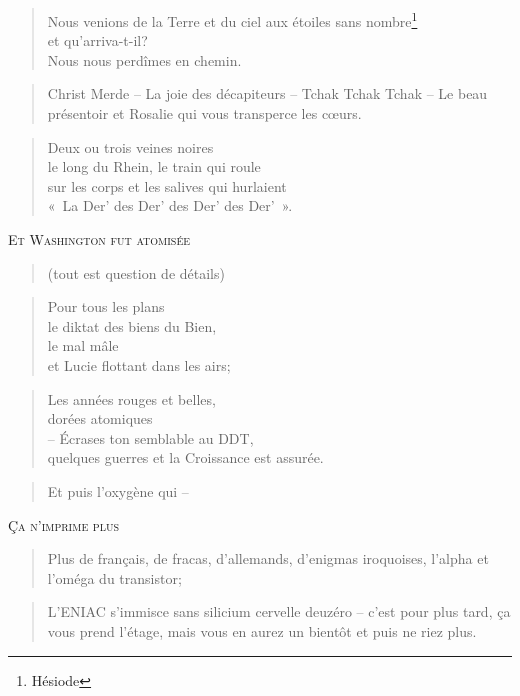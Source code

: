   \begin{verse}
    Nous venions de la Terre et du ciel aux étoiles sans nombre\footnote{Hésiode}\\
    et qu’arriva-t-il?\\
    Nous nous perdîmes en chemin.
  \end{verse}
  \begin{verse}
    Christ Merde -- La joie des décapiteurs -- Tchak Tchak Tchak -- Le beau 
    présentoir et Rosalie qui vous transperce les cœurs.
  \end{verse}
  \begin{verse}
    Deux ou trois veines noires\\
    le long du Rhein, le train qui roule\\
    sur les corps et les salives qui hurlaient\\
    «~La Der’ des Der’ des Der’ des Der’~».
  \end{verse}
  \begin{center}
    \textsc{Et Washington fut atomisée}
  \end{center}
  \begin{verse}
    (tout est question de détails)
  \end{verse}
  \begin{verse}
    Pour tous les plans\\
    le diktat des biens du Bien,\\
    le mal mâle\\
    et Lucie flottant dans les airs;
  \end{verse}
  \begin{verse}
    Les années rouges et belles,\\
    dorées atomiques\\
    -- Écrases ton semblable au DDT,\\
    quelques guerres et la Croissance est assurée.
  \end{verse}
  \begin{verse}
    Et puis l’oxygène qui --
  \end{verse}
  \begin{center}
    \textsc{Ça n’imprime plus}
  \end{center}
  \begin{verse}
    Plus  de  français,  de  fracas,  d’allemands,  d’enigmas  iroquoises,
    l’alpha et l’oméga du transistor;
  \end{verse}
  \begin{verse}
    L’ENIAC s’immisce sans silicium cervelle  deuzéro -- c’est pour plus
    tard, ça vous prend l’étage, mais vous  en aurez un bientôt et puis ne
    riez plus.
  \end{verse}
